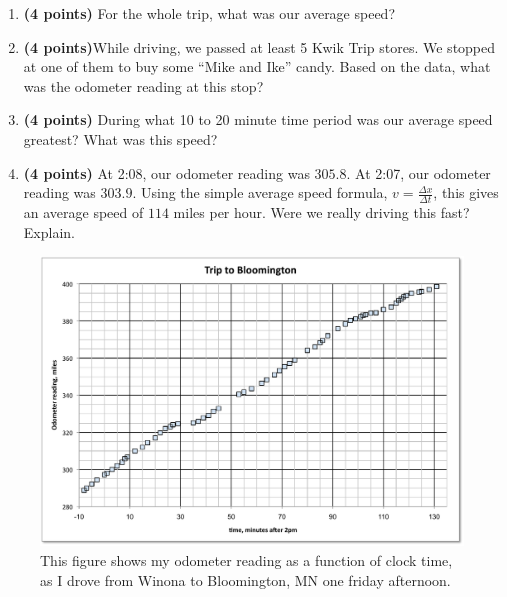 \documentclass[10pt]{article}
\begin{document}
\begin{enumerate}
\begin{enumerate}
\item \textbf{(4 points)} For the whole trip, what was our average speed? 

\item \textbf{(4 points)}While driving, we passed at least 5 Kwik Trip stores.  We stopped at one of them to buy some ``Mike and Ike'' candy.  Based on the data, what was the odometer reading at this stop? 

\item \textbf{(4 points)} During what 10 to 20 minute time period was our average speed greatest? What was this speed?

\item \textbf{(4 points)} At 2:08, our odometer reading was $305.8$.  At 2:07, our odometer reading was $303.9$.  Using the simple average speed formula, $v=\frac{\Delta x}{\Delta t}$, this gives an average speed of $114$ miles per hour.  Were we really driving this fast? Explain.


\end{enumerate}
     \begin{figure}[h]
	\begin{center}
        \includegraphics[width=1.2\textwidth, angle=0]{distance.pdf}
        \caption{This figure shows my odometer reading as a function of clock time, as I drove from Winona to Bloomington, MN one friday afternoon.}
        \label{fig:dist}
	\end{center}
        \end{figure}
        
\clearpage

\end{enumerate}
\end{document}
